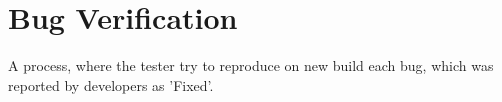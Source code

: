 \section{Bug Verification}
\label{sec:Bug Verification}

A process, where the tester try to reproduce on new build each bug, which was reported by developers as 'Fixed'.